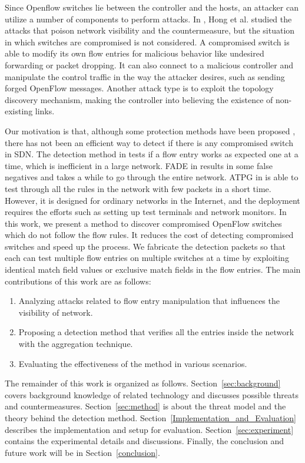 \documentclass[conference]{IEEEtran}
\begin{document}
Since Openflow switches lie between the controller and the hosts, an attacker can utilize a number of components to perform attacks. In \cite{HXWG15}, Hong et al. studied the attacks that poison network visibility and the countermeasure, but the situation in which switches are compromised is not considered. A compromised switch is able to modify its own flow entries for malicious behavior like undesired forwarding or packet dropping. It can also connect to a malicious controller and manipulate the control traffic in the way the attacker desires, such as sending forged OpenFlow messages. Another attack type is to exploit the topology discovery mechanism, making the controller into believing the existence of non-existing links.

Our motivation is that, although some protection methods have been proposed \cite{CKGL15,PJL16}, there has not been an efficient way to detect if there is any compromised switch in SDN. The detection method in \cite{CKGL15} tests if a flow entry works as expected one at a time, which is inefficient in a large network. FADE in \cite{PJL16} results in some false negatives and takes a while to go through the entire network. ATPG in \cite{ZKVM12} is able to test through all the rules in the network with few packets in a short time. However, it is designed for ordinary networks in the Internet, and the deployment requires the efforts such as setting up test terminals and network monitors. In this work, we present a method to discover compromised OpenFlow switches which do not follow the flow rules. It reduces the cost of detecting compromised switches and speed up the process. We fabricate the detection packets so that each can test multiple flow entries on multiple switches at a time by exploiting identical match field values or exclusive match fields in the flow entries. The main contributions of this work are as follows:

\begin{enumerate}
\item
Analyzing attacks related to flow entry manipulation that influences the visibility of network.
\item
Proposing a detection method that verifies all the entries inside the network with the aggregation technique.
\item
Evaluating the effectiveness of the method in various scenarios.
\end{enumerate}

The remainder of this work is organized as follows. Section~\ref{sec:background} covers background knowledge of related technology and discusses possible threats and countermeasures. Section~\ref{sec:method} is about the threat model and the theory behind the detection method. Section~\ref{Implementation_and_Evaluation} describes the implementation and setup for evaluation. Section~\ref{sec:experiment} contains the experimental details and discussions. Finally, the conclusion and future work will be in Section~\ref{conclusion}.
\end{document}
